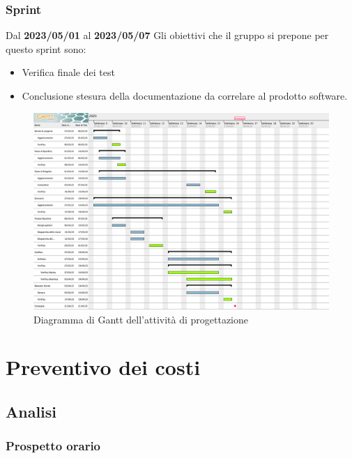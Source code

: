 \subsubsection{ Sprint}
Dal \textbf{2023/05/01} al \textbf{2023/05/07}
\newline
Gli obiettivi che il gruppo si prepone per questo sprint sono:
\begin{itemize}
    \item Verifica finale dei test
    \item Conclusione stesura della documentazione da correlare al prodotto software.
\end{itemize}
\begin{figure}[H]
    \centering
    \includegraphics[scale=0.32]{src/img/Gantt progettazione.png}
    \caption{Diagramma di Gantt dell'attività di progettazione}
\end{figure}


\section{Preventivo dei costi}
\subsection{Analisi}
\subsubsection{Prospetto orario}
\renewcommand{\arraystretch}{1.8}

